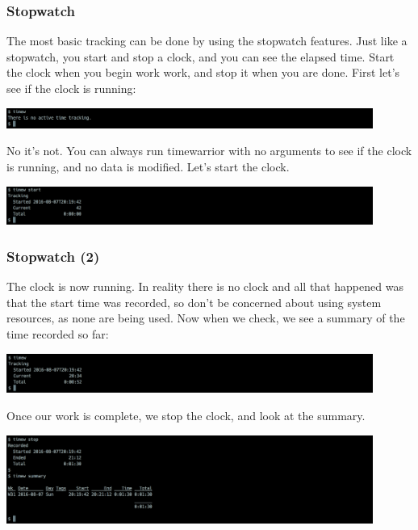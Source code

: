 \documentclass[t,handout]{beamer}
\begin{document}
\begin{frame}[fragile]\frametitle{Stopwatch}
    The most basic tracking can be done by using the stopwatch features. Just like a stopwatch, you start and stop a clock, and you can see the elapsed time. Start the clock when you begin work work, and stop it when you are done. First let's see if the clock is running:

    \includegraphics[width=12cm]{images/tutorial3.png}

    No it's not. You can always run timewarrior with no arguments to see if the clock is running, and no data is modified. Let's start the clock.

    \includegraphics[width=12cm]{images/tutorial4.png}
\end{frame}

\begin{frame}[fragile]\frametitle{Stopwatch (2)}
    The clock is now running. In reality there is no clock and all that happened was that the start time was recorded, so don't be concerned about using system resources, as none are being used. Now when we check, we see a summary of the time recorded so far:

    \includegraphics[width=12cm]{images/tutorial5.png}

    Once our work is complete, we stop the clock, and look at the summary.

    \includegraphics[width=12cm]{images/tutorial6.png}
\end{frame}
\end{document}
